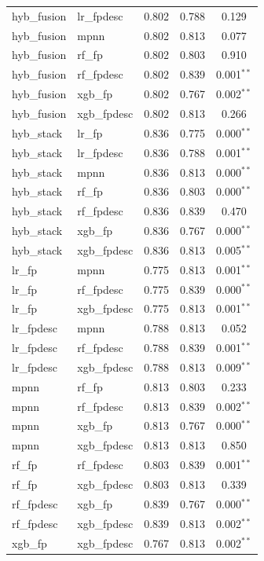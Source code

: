 \begin{table}[t]
\begin{tabular}{llccc}
hyb\_fusion & lr\_fpdesc & 0.802 & 0.788 & 0.129 \\
hyb\_fusion & mpnn & 0.802 & 0.813 & 0.077 \\
hyb\_fusion & rf\_fp & 0.802 & 0.803 & 0.910 \\
hyb\_fusion & rf\_fpdesc & 0.802 & 0.839 & 0.001$^{**}$ \\
hyb\_fusion & xgb\_fp & 0.802 & 0.767 & 0.002$^{**}$ \\
hyb\_fusion & xgb\_fpdesc & 0.802 & 0.813 & 0.266 \\
hyb\_stack & lr\_fp & 0.836 & 0.775 & 0.000$^{**}$ \\
hyb\_stack & lr\_fpdesc & 0.836 & 0.788 & 0.001$^{**}$ \\
hyb\_stack & mpnn & 0.836 & 0.813 & 0.000$^{**}$ \\
hyb\_stack & rf\_fp & 0.836 & 0.803 & 0.000$^{**}$ \\
hyb\_stack & rf\_fpdesc & 0.836 & 0.839 & 0.470 \\
hyb\_stack & xgb\_fp & 0.836 & 0.767 & 0.000$^{**}$ \\
hyb\_stack & xgb\_fpdesc & 0.836 & 0.813 & 0.005$^{**}$ \\
lr\_fp & mpnn & 0.775 & 0.813 & 0.001$^{**}$ \\
lr\_fp & rf\_fpdesc & 0.775 & 0.839 & 0.000$^{**}$ \\
lr\_fp & xgb\_fpdesc & 0.775 & 0.813 & 0.001$^{**}$ \\
lr\_fpdesc & mpnn & 0.788 & 0.813 & 0.052 \\
lr\_fpdesc & rf\_fpdesc & 0.788 & 0.839 & 0.001$^{**}$ \\
lr\_fpdesc & xgb\_fpdesc & 0.788 & 0.813 & 0.009$^{**}$ \\
mpnn & rf\_fp & 0.813 & 0.803 & 0.233 \\
mpnn & rf\_fpdesc & 0.813 & 0.839 & 0.002$^{**}$ \\
mpnn & xgb\_fp & 0.813 & 0.767 & 0.000$^{**}$ \\
mpnn & xgb\_fpdesc & 0.813 & 0.813 & 0.850 \\
rf\_fp & rf\_fpdesc & 0.803 & 0.839 & 0.001$^{**}$ \\
rf\_fp & xgb\_fpdesc & 0.803 & 0.813 & 0.339 \\
rf\_fpdesc & xgb\_fp & 0.839 & 0.767 & 0.000$^{**}$ \\
rf\_fpdesc & xgb\_fpdesc & 0.839 & 0.813 & 0.002$^{**}$ \\
xgb\_fp & xgb\_fpdesc & 0.767 & 0.813 & 0.002$^{**}$ \\
\bottomrule
\end{tabular}
\end{table}

